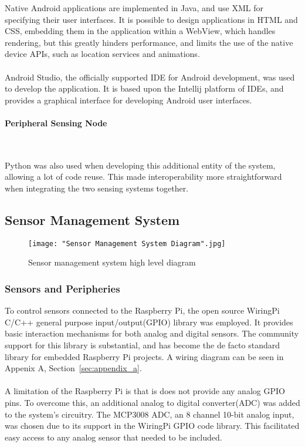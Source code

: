 \documentclass{article}
\begin{document}
\noindent
Native Android applications are implemented in Java, and use XML for specifying their user interfaces. It is possible to design applications in HTML and CSS, embedding them in the application within a WebView, which handles rendering, but this greatly hinders performance, and limits the use of the native device APIs, such as location services and animations. \\\\ Android Studio, the officially supported IDE for Android development, was used to develop the application. It is based upon the Intellij platform of IDEs, and provides a graphical interface for developing Android user interfaces.  

\paragraph{Peripheral Sensing Node}\

\noindent
Python was also used when developing this additional entity of the system, allowing a lot of code reuse. This made interoperability more straightforward when integrating the two sensing systems together.

\newpage
\subsection{Sensor Management System}

\begin{figure}[H]
\centering
\texttt{[image: "Sensor Management System Diagram".jpg]}
\caption{Sensor management system high level diagram}
\label{fig:sms_high_level_arch}
\end{figure}

\subsubsection{Sensors and Peripheries}
To control sensors connected to the Raspberry Pi, the open source WiringPi C/C++ general purpose input/output(GPIO) library was employed. It provides basic interaction mechanisms for both analog and digital sensors. The community support for this library is substantial, and has become the de facto standard library for embedded Raspberry Pi projects. A wiring diagram can be seen in Appenix A, Section~\ref{sec:appendix_a}. \\\\
A limitation of the Raspberry Pi is that is does not provide any analog GPIO pins. To overcome this, an additional analog to digital converter(ADC) was added to the system’s circuitry. The MCP3008 ADC, an 8 channel 10-bit analog input,  was chosen due to its support in the WiringPi GPIO code library. This facilitated easy access to any analog sensor that needed to be included. \\\\
\end{document}
